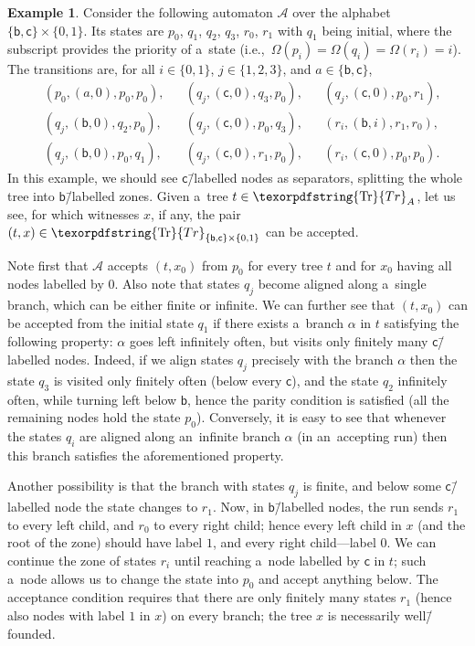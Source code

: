 \documentclass[11pt,a4paper]{amsart}
\theoremstyle{plain}
\theoremstyle{definition}
\newtheorem{exa}[thm]{Example}
\theoremstyle{defC}
\theoremstyle{thmC}
\theoremstyle{plain}
\numberwithin{equation}{section}
\numberwithin{equation}{section}
\numberwithin{figure}{section}
\newcommand{\ident}[1]{\ensuremath{\texorpdfstring{\mathrm{\mathnm{#1}}}{#1}}\xspace}
\newcommand{\mathcalsym}[1]{\ensuremath{\mathcal{#1}}\xspace}
\newcommand{\CA}{\mathcalsym{A}}
\newcommand{\mathnm}[1]{#1}
\newcommand{\trees}{\ident{Tr}}
\begin{document}
\begin{exa}\label{ex:automaton}
	Consider the following automaton $\CA$ over the alphabet $\{\mathsf{b},\mathsf{c}\}\times\{0,1\}$.
	Its states are $p_0$, $q_1$, $q_2$, $q_3$, $r_0$, $r_1$ with $q_1$ being initial, where the subscript provides the priority of a~state (i.e.,~$\Omega(p_i)=\Omega(q_i)=\Omega(r_i)=i$).
	The transitions are, for all $i\in\{0,1\}$, $j\in\{1,2,3\}$, and $a\in\{\mathsf{b},\mathsf{c}\}$,
	\begin{align*}
		&(p_0,(a,0),p_0,p_0),&		&(q_j,(\mathsf{c},0),q_3,p_0),&	&(q_j,(\mathsf{c},0),p_0,r_1),\\
		&(q_j,(\mathsf{b},0),q_2,p_0),&	&(q_j,(\mathsf{c},0),p_0,q_3),&	&(r_i,(\mathsf{b},i),r_1,r_0),\\
		&(q_j,(\mathsf{b},0),p_0,q_1),&	&(q_j,(\mathsf{c},0),r_1,p_0),&	&(r_i,(\mathsf{c},0),p_0,p_0).
	\end{align*}
	In this example, we should see $\mathsf{c}$\=/labelled nodes as separators, splitting the whole tree into $\mathsf{b}$\=/labelled zones.
	Given a~tree $t\in\trees_A$, let us see, for which witnesses $x$, if any, the pair $(t,x)\in\trees_{\{\mathsf{b},\mathsf{c}\}\times\{0,1\}}$ can be accepted.

	Note first that $\CA$ accepts $(t,x_0)$ from $p_0$ for every tree $t$ and for $x_0$ having all nodes labelled by $0$.
	Also note that states $q_j$ become aligned along a~single branch, which can be either finite or infinite.
	We can further see that $(t,x_0)$ can be accepted from the initial state $q_1$ if there exists a~branch $\alpha$ in $t$ satisfying the following property:
	$\alpha$ goes left infinitely often, but visits only finitely many $\mathsf{c}$\=/labelled nodes.
	Indeed, if we align states $q_j$ precisely with the branch $\alpha$ then the state $q_3$ is visited only finitely often (below every $\mathsf{c}$),
	and the state $q_2$ infinitely often, while turning left below $\mathsf{b}$, hence the parity condition is satisfied
	(all the remaining nodes hold the state $p_0$).
	Conversely, it is easy to see that whenever the states $q_i$ are aligned along an~infinite branch $\alpha$ (in an~accepting run) then this branch satisfies the aforementioned property.

	Another possibility is that the branch with states $q_j$ is finite, and below some $\mathsf{c}$\=/labelled node the state changes to $r_1$.
	Now, in $\mathsf{b}$\=/labelled nodes, the run sends $r_1$ to every left child, and $r_0$ to every right child;
	hence every left child in $x$ (and the root of the zone) should have label $1$, and every right child---label $0$.
	We can continue the zone of states $r_i$ until reaching a~node labelled by $\mathsf{c}$ in $t$;
	such a~node allows us to change the state into $p_0$ and accept anything below.
	The acceptance condition requires that there are only finitely many states $r_1$ (hence also nodes with label $1$ in $x$) on every branch;
	the tree $x$ is necessarily well\=/founded.
	

\end{exa}
\end{document}

